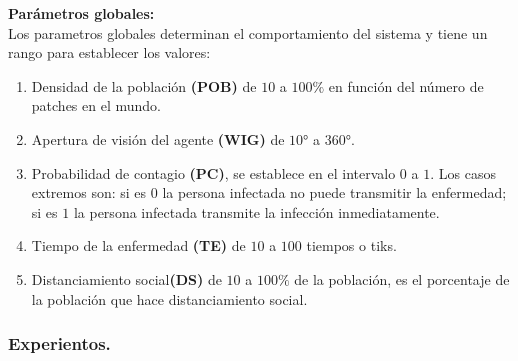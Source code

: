 \documentclass[12pt]{article}
\begin{document}
\textbf{Parámetros globales:}\\

Los parametros globales determinan el comportamiento del sistema y tiene un rango para establecer los valores:\\

\begin{enumerate}
    \item Densidad de la población \textbf{(POB)} de $10$ a $100\%$ en función del número de patches en el mundo.
    \item Apertura de visión del agente \textbf{(WIG)} de $10$° a $360$°.
    \item Probabilidad de contagio \textbf{(PC)}, se establece en el intervalo $0$ a $1$. Los casos extremos son: si es $0$ la persona infectada no puede transmitir la enfermedad; si es $1$ la persona infectada
    transmite la infección inmediatamente.
    \item Tiempo de la enfermedad \textbf{(TE)} de $10$ a $100$ tiempos o tiks.
    \item Distanciamiento social\textbf{(DS)} de $10$ a $100\%$ de la población, es el porcentaje de la población que hace distanciamiento social.
\end{enumerate}

{\color{blue} \subsubsection*{Experientos.}}
\vspace{1em}
\end{document}
